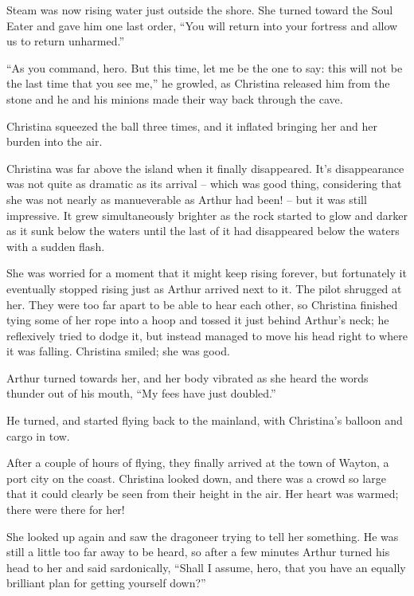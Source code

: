 \documentclass[showtrims,b6paper,draft,10pt]{memoir}
\begin{document}
Steam was now rising water just outside the shore.  She turned toward the Soul Eater and gave him one last order, ``You will return into your fortress and allow us to return unharmed.''

``As you command, hero.  But this time, let me be the one to say:  this will not be the last time that you see me,'' he growled, as Christina released him from the stone and he and his minions made their way back through the cave.

Christina squeezed the ball three times, and it inflated bringing her and her burden into the air.

\timeskip

Christina was far above the island when it finally disappeared.  It's disappearance was not quite as dramatic as its arrival -- which was good thing, considering that she was not nearly as manueverable as Arthur had been! -- but it was still impressive.  It grew simultaneously brighter as the rock started to glow and darker as it sunk below the waters until the last of it had disappeared below the waters with a sudden flash.

She was worried for a moment that it might keep rising forever, but fortunately it eventually stopped rising just as Arthur arrived next to it.  The pilot shrugged at her.  They were too far apart to be able to hear each other, so Christina finished tying some of her rope into a hoop and tossed it just behind Arthur's neck;  he reflexively tried to dodge it, but instead managed to move his head right to where it was falling.  Christina smiled;  she was good.

Arthur turned towards her, and her body vibrated as she heard the words thunder out of his mouth, ``My fees have just doubled.''

He turned, and started flying back to the mainland, with Christina's balloon and cargo in tow.

After a couple of hours of flying, they finally arrived at the town of Wayton, a port city on the coast.  Christina looked down, and there was a crowd so large that it could clearly be seen from their height in the air.  Her heart was warmed;  there were there for her!

She looked up again and saw the dragoneer trying to tell her something.  He was still a little too far away to be heard, so after a few minutes Arthur turned his head to her and said sardonically,  ``Shall I assume, hero, that you have an equally brilliant plan for getting yourself down?''
\end{document}
